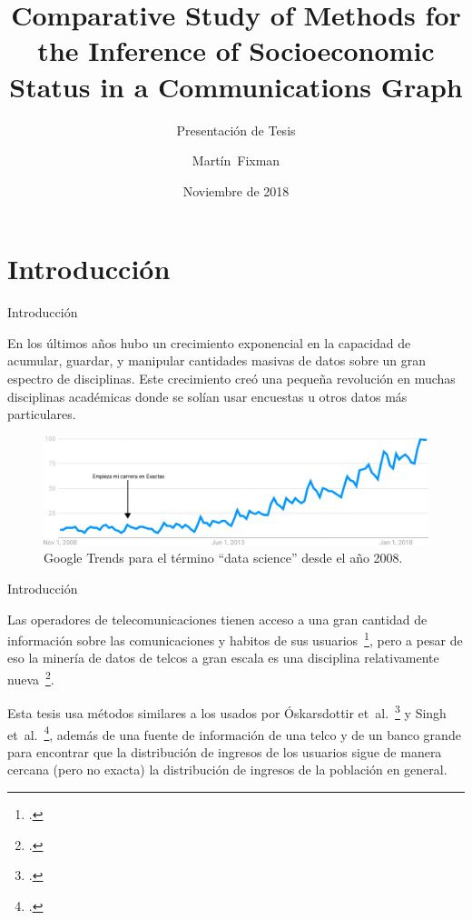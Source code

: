 \documentclass[usenames,dvipsnames,table]{beamer}
\title[Inference of Socioeconomic Status]{Comparative Study of Methods for the Inference of Socioeconomic Status in a Communications Graph}
\subtitle{Presentación de Tesis}
\author{Martín~Fixman}
\date{Noviembre de 2018}
\institute[FCEN UBA]{Facultad de Ciencias Exactas y Naturales \\ Universidad de Buenos Aires}
\begin{document}
\begin{frame}
	\hypersetup{pageanchor=false}
	\titlepage{} 
	\hypersetup{pageanchor=true}
\end{frame}

\section{Introducción}

\begin{frame}{Introducción}

	En los últimos años hubo un crecimiento exponencial en la capacidad de acumular, guardar, y manipular cantidades masivas de datos sobre un gran espectro de disciplinas.
	Este crecimiento creó una pequeña revolución en muchas disciplinas académicas donde se solían usar encuestas u otros datos más particulares.

	\begin{figure}
		\includegraphics[width=\framewidth,height=.5\textheight,keepaspectratio]{data_science_google_trends.png}
		\caption{Google Trends para el término ``data science'' desde el año 2008.}
	\end{figure}

\end{frame}

\begin{frame}{Introducción}

	Las operadores de telecomunicaciones tienen acceso a una gran cantidad de información sobre las comunicaciones y habitos de sus usuarios~\footcite{huurdeman2003}, pero a pesar de eso la minería de datos de telcos a gran escala es una disciplina relativamente nueva~\footcite{han2002emerging}.

	Esta tesis usa métodos similares a los usados por Óskarsdottir et~al.~\footcite{oskarsdottir2016} y Singh et~al.~\footcite{singh2013predicting}, además de una fuente de información de una telco y de un banco grande para encontrar que la distribución de ingresos de los usuarios sigue de manera cercana (pero no exacta) la distribución de ingresos de la población en general.
\end{frame}
\end{document}
